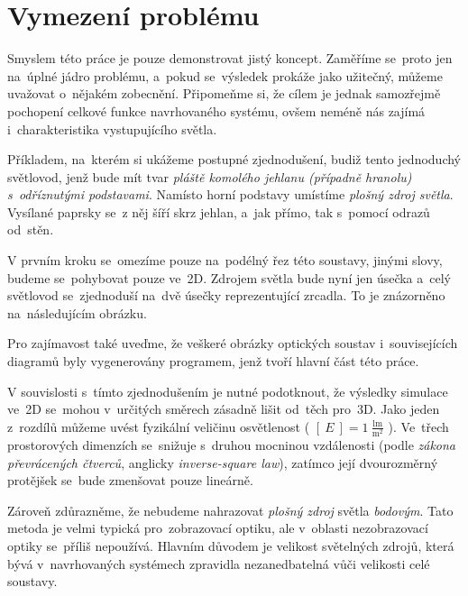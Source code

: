\section{Vymezení problému}
\label{sec:vymezeniproblemu}

Smyslem této práce je pouze demonstrovat jistý koncept. Zaměříme se~proto jen na~úpl\-né jádro problému, a~pokud se~výsledek prokáže jako užitečný, můžeme uvažovat o~nějakém zobecnění. Připomeňme si, že cílem je jednak samozřejmě pochopení celkové funkce navrhovaného systému, ovšem neméně nás zajímá i~charakteristika vystupujícího světla.

Příkladem, na~kterém si ukážeme postupné zjednodušení, budiž tento jednoduchý světlovod, jenž bude mít tvar \emph{pláště komolého jehlanu (případně hranolu) s~odříznutými podstavami}. Namísto horní podstavy umístíme \emph{plošný zdroj světla}. Vysílané paprsky se~z něj šíří skrz jehlan, a~jak přímo, tak s~pomocí odrazů od~stěn.

V prvním kroku se~omezíme pouze na~podélný řez této soustavy, jinými slovy, budeme se~pohybovat pouze ve~2D. Zdrojem světla bude nyní jen úsečka a~celý světlovod se~zjednoduší na~dvě úsečky reprezentující zrcadla. To je znázorněno na~následujícím obrázku.

Pro zajímavost také uveďme, že veškeré obrázky optických soustav i~souvisejících diagramů byly vygenerovány programem, jenž tvoří hlavní část této práce. 


V souvislosti s~tímto zjednodušením je nutné podotknout, že výsledky simulace ve~2D se~mohou v~určitých směrech zásadně lišit od~těch pro~3D. Jako jeden z~rozdílů můžeme uvést fyzikální veličinu osvětlenost ( $ [\ E\ ] = 1 \ \mathrm{\frac{lm}{m^2}} $ ). Ve~třech prostorových dimenzích se~snižuje s~druhou mocninou vzdálenosti (podle \emph{zákona převrácených čtverců}, anglicky \emph{inverse-square law}), zatímco její dvourozměrný protějšek se~bude zmenšovat pouze lineárně.

Zároveň zdůrazněme, že nebudeme nahrazovat \emph{plošný zdroj} světla \emph{bodovým}. Tato metoda je velmi typická pro~zobrazovací optiku, ale v~oblasti nezobrazovací optiky se~příliš nepoužívá. Hlavním důvodem je velikost světelných zdrojů, která bývá v~navrhovaných systémech zpravidla nezanedbatelná vůči velikosti celé soustavy.

